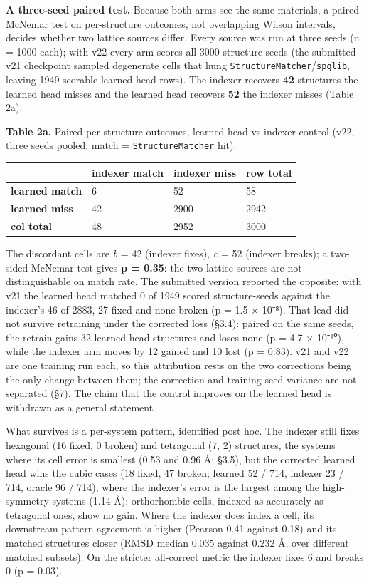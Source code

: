 \documentclass[
  11pt,
]{article}
\newcounter{none} %
\begin{document}
\textbf{A three-seed paired test.} Because both arms see the same
materials, a paired McNemar test on per-structure outcomes, not
overlapping Wilson intervals, decides whether two lattice sources
differ. Every source was run at three seeds (n = 1000 each); with v22
every arm scores all 3000 structure-seeds (the submitted v21 checkpoint
sampled degenerate cells that hung
\texttt{StructureMatcher}/\texttt{spglib}, leaving 1949 scorable
learned-head rows). The indexer recovers \textbf{42} structures the
learned head misses and the learned head recovers \textbf{52} the
indexer misses (Table 2a).

\textbf{Table 2a.} Paired per-structure outcomes, learned head vs
indexer control (v22, three seeds pooled; match =
\texttt{StructureMatcher} hit).

{\def\LTcaptype{none} %
\begin{longtable}[]{@{}llll@{}}
\toprule\noalign{}
& indexer \textbf{match} & indexer \textbf{miss} & row total \\
\midrule\noalign{}
\endhead
\bottomrule\noalign{}
\endlastfoot
\textbf{learned match} & 6 & 52 & 58 \\
\textbf{learned miss} & 42 & 2900 & 2942 \\
\textbf{col total} & 48 & 2952 & 3000 \\
\end{longtable}
}

The discordant cells are \emph{b} = 42 (indexer fixes), \emph{c} = 52
(indexer breaks); a two-sided McNemar test gives \textbf{p = 0.35}: the
two lattice sources are not distinguishable on match rate. The submitted
version reported the opposite: with v21 the learned head matched 0 of
1949 scored structure-seeds against the indexer's 46 of 2883, 27 fixed
and none broken (p = 1.5 × 10⁻⁸). That lead did not survive retraining
under the corrected loss (§3.4): paired on the same seeds, the retrain
gains 32 learned-head structures and loses none (p = 4.7 × 10⁻¹⁰), while
the indexer arm moves by 12 gained and 10 lost (p = 0.83). v21 and v22
are one training run each, so this attribution rests on the two
corrections being the only change between them; the correction and
training-seed variance are not separated (§7). The claim that the
control improves on the learned head is withdrawn as a general
statement.

What survives is a per-system pattern, identified post hoc. The indexer
still fixes hexagonal (16 fixed, 0 broken) and tetragonal (7, 2)
structures, the systems where its cell error is smallest (0.53 and 0.96
Å; §3.5), but the corrected learned head wins the cubic cases (18 fixed,
47 broken; learned 52 / 714, indexer 23 / 714, oracle 96 / 714), where
the indexer's error is the largest among the high-symmetry systems (1.14
Å); orthorhombic cells, indexed as accurately as tetragonal ones, show
no gain. Where the indexer does index a cell, its downstream pattern
agreement is higher (Pearson 0.41 against 0.18) and its matched
structures closer (RMSD median 0.035 against 0.232 Å, over different
matched subsets). On the stricter all-correct metric the indexer fixes 6
and breaks 0 (p = 0.03).
\end{document}
